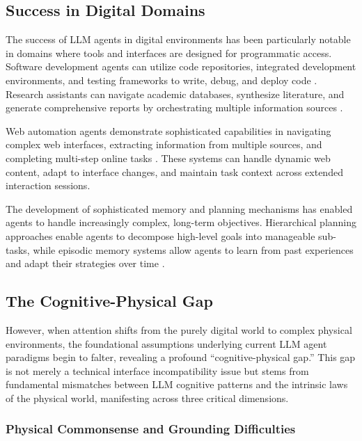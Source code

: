 \subsection{Success in Digital Domains}

The success of LLM agents in digital environments has been particularly notable in domains where tools and interfaces are designed for programmatic access. Software development agents can utilize code repositories, integrated development environments, and testing frameworks to write, debug, and deploy code \cite{nijkamp2022codegen}. Research assistants can navigate academic databases, synthesize literature, and generate comprehensive reports by orchestrating multiple information sources \cite{press2022measuring}.

Web automation agents demonstrate sophisticated capabilities in navigating complex web interfaces, extracting information from multiple sources, and completing multi-step online tasks \cite{deng2023mind2web}. These systems can handle dynamic web content, adapt to interface changes, and maintain task context across extended interaction sessions.

The development of sophisticated memory and planning mechanisms has enabled agents to handle increasingly complex, long-term objectives. Hierarchical planning approaches enable agents to decompose high-level goals into manageable sub-tasks, while episodic memory systems allow agents to learn from past experiences and adapt their strategies over time \cite{sumers2023cognitive}.

\subsection{The Cognitive-Physical Gap}

However, when attention shifts from the purely digital world to complex physical environments, the foundational assumptions underlying current LLM agent paradigms begin to falter, revealing a profound ``cognitive-physical gap.'' This gap is not merely a technical interface incompatibility issue but stems from fundamental mismatches between LLM cognitive patterns and the intrinsic laws of the physical world, manifesting across three critical dimensions.

\subsubsection{Physical Commonsense and Grounding Difficulties}

